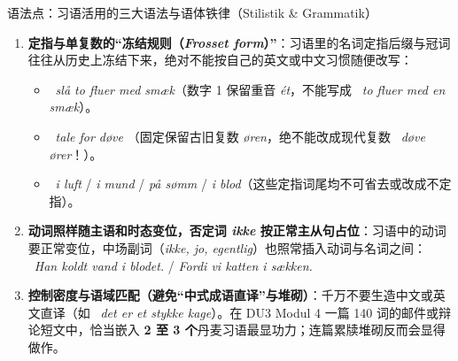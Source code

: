 \begin{grammatikbox}{语法点：习语活用的三大语法与语体铁律（Stilistik \& Grammatik）}
\begin{enumerate}
  \item \textbf{定指与单复数的“冻结规则（\textit{Frosset form}）”}：习语里的名词定指后缀与冠词往往从历史上冻结下来，绝对不能按自己的英文或中文习惯随便改写：
    \begin{itemize}
      \item {}\ \textit{slå to fluer med  smæk}（数字 1 保留重音 \textit{ét}，不能写成 \ \textit{to fluer med en smæk}）。
      \item {}\ \textit{tale for døve }（固定保留古旧复数 \textit{øren}，绝不能改成现代复数 \ \textit{døve ører}！）。
      \item {}\ \textit{i luft} / \textit{i mund} / \textit{på sømm} / \textit{i blod}（这些定指词尾均不可省去或改成不定指）。
    \end{itemize}
  \item \textbf{动词照样随主语和时态变位，否定词 \textit{ikke} 按正常主从句占位}：习语中的动词要正常变位，中场副词（\textit{ikke, jo, egentlig}）也照常插入动词与名词之间：\newline
    \ \textit{Han  koldt vand i blodet.} / \textit{Fordi vi  katten i sækken.}
  \item \textbf{控制密度与语域匹配（避免“中式成语直译”与堆砌）}：千万不要生造中文或英文直译（如 \ \textit{det er et stykke kage}）。在 DU3 Modul 4 一篇 140 词的邮件或辩论短文中，恰当嵌入 \textbf{2 至 3 个}丹麦习语最显功力；连篇累牍堆砌反而会显得做作。
\end{enumerate}
\end{grammatikbox}


